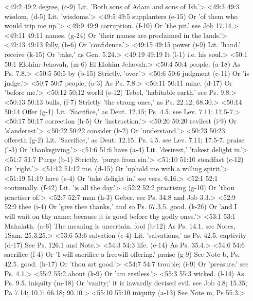 <49:2 49:2  degree, (c-9)  Lit. 'Both sons of Adam and sons of Ish.'>
<49:3 49:3  wisdom, (d-5)  Lit. 'wisdoms.'>
<49:5 49:5  supplanters (e-15)  Or 'of them who would trip me up.'>
<49:9 49:9  corruption. (f-10)  Or 'the pit.' see Job 17.14.>
<49:11 49:11  names. (g-24)  Or 'their names are proclaimed in the lands.'>
<49:13 49:13  folly, (h-6)  Or 'confidence.'>
<49:15 49:15  power (i-9)  Lit. 'hand.'
  receive (k-15)  Or 'take,' as Gen. 5.24.>
<49:19 49:19  It (l-1)  i.e. his soul.>
<50:1 50:1  Elohim-Jehovah, (m-6)  El Elohim Jehovah.>
<50:4 50:4  people. (a-18) As Ps. 7.8.>
<50:5 50:5  by (b-15)  Strictly, 'over.'>
<50:6 50:6  judgment (c-11)  Or 'is judge.'>
<50:7 50:7  people, (a-3)  As Ps. 7.8.>
<50:11 50:11  mine. (d-17)  Or 'before me.'>
<50:12 50:12  world (e-12)  Tebel, 'habitable earth.' see Ps. 9.8.>
<50:13 50:13  bulls, (f-7)  Strictly 'the strong ones,' as Ps. 22.12; 68.30.>
<50:14 50:14  Offer (g-1)  Lit. 'Sacrifice,' as Deut. 12.15; Ps. 4.5. see Lev. 7.11; 17.5-7.>
<50:17 50:17  correction (h-5)  Or 'instruction.'>
<50:20 50:20  revilest (i-9)  Or 'slanderest.'>
<50:22 50:22  consider (k-2)  Or 'understand.'>
<50:23 50:23  offereth (g-2)  Lit. 'Sacrifice,' as Deut. 12.15; Ps. 4.5. see Lev. 7.11; 17.5-7.
  praise (l-3)  Or 'thanksgiving.'>
<51:6 51:6  have (a-4)  Lit. 'desirest,' 'takest delight in.'>
<51:7 51:7  Purge (b-1)  Strictly, 'purge from sin.'>
<51:10 51:10  steadfast (c-12)  Or 'right.'>
<51:12 51:12  me. (d-15)  Or 'uphold me with a willing spirit.'>
<51:19 51:19  have (e-4)  Or 'take delight in.' see vers. 6,16.>
<52:1 52:1  continually. (f-42)  Lit. 'is all the day.'>
<52:2 52:2  practising (g-10)  Or 'thou practiser of.'>
<52:7 52:7  man (h-3)  Geber. see Ps. 34.8 and Job 3.3.>
<52:9 52:9  thee (i-4)  Or 'give thee thanks,' and so Ps. 67.3,5.
  good. (k-26)  Or 'and I will wait on thy name; because it is good before  thy godly ones.'>
<53:1 53:1  Mahalath. (a-6)  The meaning is uncertain.
  fool (b-12)  As Ps. 14.1. see Notes, 1Sam. 25.3,25.>
<53:6 53:6  salvation (c-4)  Lit. 'salvations,' as Ps. 42.5.
  captivity (d-17)  See Ps. 126.1 and Note.>
<54:3 54:3  life. (e-14)  As Ps. 35.4.>
<54:6 54:6  sacrifice (f-4)  Or 'I will sacrifice a freewill offering.'
  praise (g-9)  See Note b, Ps. 42.5.
  good. (h-17)  Or 'thou art good.'>
<54:7 54:7  trouble; (i-9)  Or 'pressure.' see Ps. 4.1.>
<55:2 55:2  about (k-9)  Or 'am restless.'>
<55:3 55:3  wicked. (l-14)  As Ps. 9.5.
  iniquity (m-18)  Or 'vanity;' it is inwardly devised evil. see Job 4.8; 15.35;  Pa 7.14; 10.7; 66.18; 90.10.>
<55:10 55:10  iniquity (a-13)  See Note m, Ps 55.3.>
